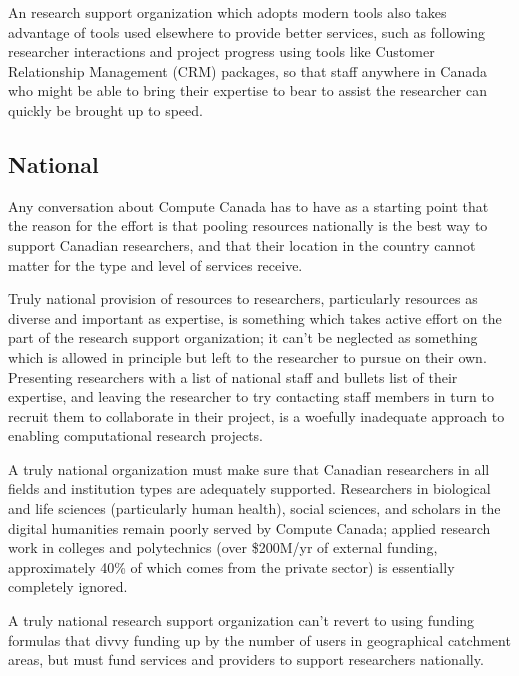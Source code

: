 \documentclass[11pt]{article}
\begin{document}
An research support organization which adopts modern tools also takes advantage of
tools used elsewhere to provide better services, such as following researcher interactions
and project progress using tools like Customer Relationship Management (CRM) packages, 
so that staff anywhere in Canada who might be able to bring their expertise to bear to
assist the researcher can quickly be brought up to speed.

\subsection*{National}

Any conversation about Compute Canada has to have as a starting
point that the reason for the effort is that pooling resources
nationally is the best way to support Canadian researchers, and
that their location in the country cannot matter for the type and
level of services receive.

Truly national provision of resources to researchers, particularly
resources as diverse and important as expertise, is something which
takes active effort on the part of the research support organization;
it can't be neglected as something which is allowed in principle but
left to the researcher to pursue on their own.  Presenting researchers
with a list of national staff and bullets list of their expertise,
and leaving the researcher to try contacting staff members in turn to
recruit them to collaborate in their project, is a woefully inadequate
approach to enabling computational research projects.

A truly national organization must make sure that Canadian researchers
in all fields and institution types are adequately supported.
Researchers in biological and life sciences (particularly human
health), social sciences, and scholars in the digital humanities
remain poorly served by Compute Canada; applied research work in
colleges and polytechnics (over \$200M/yr of external funding, approximately
40\% of which comes from the private sector) is essentially completely ignored.

A truly national research support organization can't revert to
using funding formulas that divvy funding up by the number of
users in geographical catchment areas, but must fund services and
providers to support researchers nationally.
\end{document}
